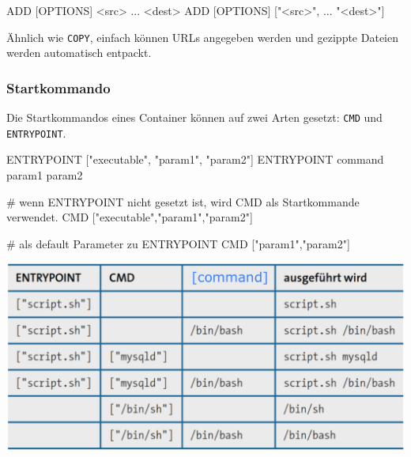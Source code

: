 \documentclass[
  10pt,
  a4paper,
]{article}
\newenvironment{Shaded}{}{}
\newcommand{\BuiltInTok}[1]{\textcolor[rgb]{0.84,0.23,0.29}{#1}}
\newcommand{\CommentTok}[1]{\textcolor[rgb]{0.42,0.45,0.49}{#1}}
\newcommand{\KeywordTok}[1]{\textcolor[rgb]{0.84,0.23,0.29}{#1}}
\newcommand{\NormalTok}[1]{\textcolor[rgb]{0.14,0.16,0.18}{#1}}
\newcommand{\StringTok}[1]{\textcolor[rgb]{0.01,0.18,0.38}{#1}}
\begin{document}
\begin{multicols*}{2}
\begin{Shaded}
\begin{Highlighting}[]
\KeywordTok{ADD}\NormalTok{ [OPTIONS] \textless{}src\textgreater{} ... \textless{}dest\textgreater{}}
\KeywordTok{ADD}\NormalTok{ [OPTIONS] [}\StringTok{"\textless{}src\textgreater{}"}\NormalTok{, ... }\StringTok{"\textless{}dest\textgreater{}"}\NormalTok{]}
\end{Highlighting}
\end{Shaded}

Ähnlich wie \texttt{COPY}, einfach können URLs angegeben werden und
gezippte Dateien werden automatisch entpackt.

\subsubsection{Startkommando}\label{startkommando}

Die Startkommandos eines Container können auf zwei Arten gesetzt:
\texttt{CMD} und \texttt{ENTRYPOINT}.

\begin{Shaded}
\begin{Highlighting}[]
\KeywordTok{ENTRYPOINT}\NormalTok{ [}\StringTok{"executable"}\NormalTok{, }\StringTok{"param1"}\NormalTok{, }\StringTok{"param2"}\NormalTok{]}
\KeywordTok{ENTRYPOINT} \BuiltInTok{command}\NormalTok{ param1 param2}
\end{Highlighting}
\end{Shaded}

\begin{Shaded}
\begin{Highlighting}[]
\CommentTok{\# wenn ENTRYPOINT nicht gesetzt ist, wird CMD als Startkommande verwendet.}
\KeywordTok{CMD}\NormalTok{ [}\StringTok{"executable"}\NormalTok{,}\StringTok{"param1"}\NormalTok{,}\StringTok{"param2"}\NormalTok{]}

\CommentTok{\# als default Parameter zu ENTRYPOINT}
\KeywordTok{CMD}\NormalTok{ [}\StringTok{"param1"}\NormalTok{,}\StringTok{"param2"}\NormalTok{]}
\end{Highlighting}
\end{Shaded}

\includegraphics{images/docker/image-1.png}


\end{multicols*}
\end{document}
